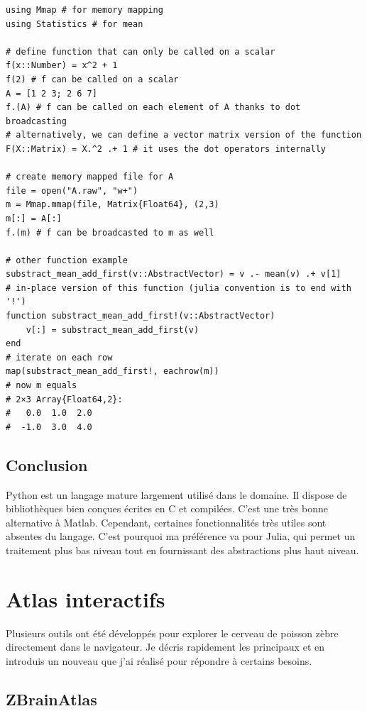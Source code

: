 \juliastyle
\begin{lstlisting}
using Mmap # for memory mapping
using Statistics # for mean

# define function that can only be called on a scalar
f(x::Number) = x^2 + 1
f(2) # f can be called on a scalar
A = [1 2 3; 2 6 7]
f.(A) # f can be called on each element of A thanks to dot broadcasting
# alternatively, we can define a vector matrix version of the function
F(X::Matrix) = X.^2 .+ 1 # it uses the dot operators internally

# create memory mapped file for A
file = open("A.raw", "w+")
m = Mmap.mmap(file, Matrix{Float64}, (2,3)
m[:] = A[:]
f.(m) # f can be broadcasted to m as well

# other function example
substract_mean_add_first(v::AbstractVector) = v .- mean(v) .+ v[1]
# in-place version of this function (julia convention is to end with '!')
function substract_mean_add_first!(v::AbstractVector)
	v[:] = substract_mean_add_first(v)
end
# iterate on each row
map(substract_mean_add_first!, eachrow(m))
# now m equals
# 2×3 Array{Float64,2}:
#   0.0  1.0  2.0
#  -1.0  3.0  4.0
\end{lstlisting}


\subsection{Conclusion}

Python est un langage mature largement utilisé dans le domaine. Il dispose de bibliothèques bien conçues écrites en C et compilées. C'est une très bonne alternative à Matlab. Cependant, certaines fonctionnalités très utiles sont absentes du langage. C'est pourquoi ma préférence va pour Julia, qui permet un traitement plus bas niveau tout en fournissant des abstractions plus haut niveau.



\section{Atlas interactifs}

Plusieurs outils ont été développés pour explorer le cerveau de poisson zèbre directement dans le navigateur. Je décris rapidement les principaux et en introduis un nouveau que j'ai réalisé pour répondre à certains besoins.

\subsection{ZBrainAtlas}


